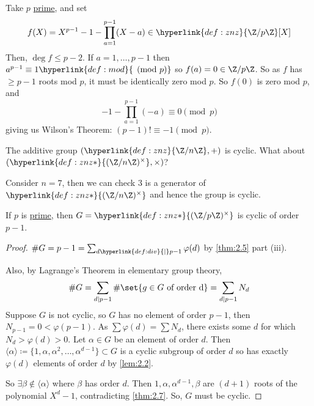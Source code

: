 \documentclass{article}
\begin{document}
\begin{eg}
    Take $p$ \hyperlink{def:prime}{prime}, and set
    \begin{equation*}f(X) = X^{p-1} - 1 - \prod_{a=1}^{p-1} (X - a) \in \hyperlink{def:znz}{\Z / p \Z} [X]\end{equation*}
    Then, $\deg f \leq p-2$. If $a=1, \dotsc, p-1$ then $a^{p-1} \equiv 1 \hyperlink{def:mod}{\pmod{p}}$ so $f(a) = 0 \in \Z/p\Z$.
    So as $f$ has $\geq p-1$ roots mod $p$, it must be identically zero mod $p$. So $f(0)$ is zero mod $p$, and
    \begin{equation*}
        -1 - \prod_{a=1}^{p-1} (-a) \equiv 0 \pmod{p}
    \end{equation*}
    giving us Wilson's Theorem: $(p-1)! \equiv -1 \pmod{p}$.
\end{eg}

The additive group $(\hyperlink{def:znz}{\Z / n\Z}, +)$ is cyclic. What about $(\hyperlink{def:znz*}{(\Z/n\Z)^\times}, \times)$?

\begin{eg}
    Consider $n=7$, then we can check $3$ is a generator of $\hyperlink{def:znz*}{(\Z / n \Z)^\times}$ and hence the group is cyclic.
\end{eg}

\begin{nthm}\label{thm:2.8}
    If $p$ is \hyperlink{def:prime}{prime}, then $G = \hyperlink{def:znz*}{(\Z / p \Z)^\times}$ is cyclic of order $p-1$.
\end{nthm}

\begin{proof}
    $\# G = p-1 = \sum_{d \hyperlink{def:div}{\mid} p-1} \varphi(d)$ by \cref{thm:2.5} part (iii).

    Also, by Lagrange's Theorem in elementary group theory, \begin{equation*}\# G = \sum_{d \mid p-1} \# \set{g \in G \ \text{of order d}} = \sum_{d \mid p-1} N_d\end{equation*}
    Suppose $G$ is not cyclic, so $G$ has no element of order $p-1$, then ${N_{p-1} = 0 < \varphi(p-1)}$.
    As $\sum \varphi(d) = \sum N_d$, there exists some $d$ for which $N_d > \varphi(d) > 0$. Let $\alpha \in G$ be an element of order $d$.
    Then $\langle\alpha\rangle \coloneqq \{1, \alpha, \alpha^2, \dotsc, \alpha^{d-1}\} \subset G$ is a cyclic subgroup of order $d$ so has exactly $\varphi(d)$ elements of order $d$ by \cref{lem:2.2}.

    So $\exists \beta \notin \langle\alpha\rangle$ where $\beta$ has order $d$.
    Then $1, \alpha, \alpha^{d-1}, \beta$ are $(d+1)$ roots of the polynomial $X^d - 1$, contradicting \cref{thm:2.7}.
    So, $G$ must be cyclic.
\end{proof}
\end{document}
